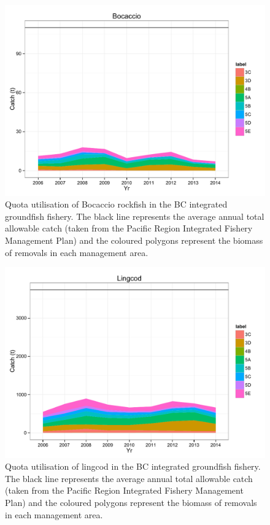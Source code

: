 \documentclass[]{scrartcl}
\begin{document}
\newpage

\begin{figure}[htbp]
\centering
\includegraphics{figures/bocaccio.pdf}
\caption{Quota utilisation of Bocaccio rockfish in the BC integrated groundfish fishery. The black line represents the average annual total allowable catch (taken from the Pacific Region Integrated Fishery Management Plan) and the coloured polygons represent the biomass of removals in each management area.}\label{fig:bocaccio}
\end{figure}

\newpage

\begin{figure}[htbp]
\begin{center}
\includegraphics{figures/lingcod.pdf}
\caption{Quota utilisation of lingcod in the BC integrated groundfish fishery. The black line represents the average annual total allowable catch (taken from the Pacific Region Integrated Fishery Management Plan) and the coloured polygons represent the biomass of removals in each management area.}\label{fig:lingcod}
\end{center}
\end{figure}
\end{document}
